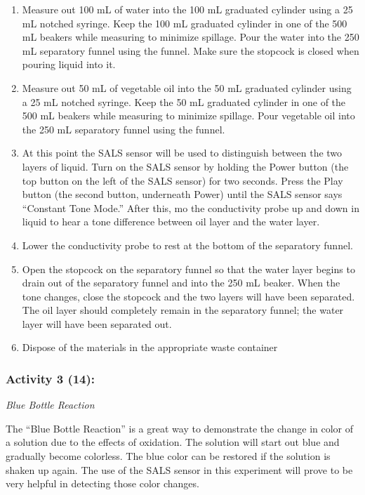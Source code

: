 \documentclass[11.5pt]{sig-alternate} %
\begin{document}
\begin{large}
\begin{enumerate}
    \item Measure out 100 mL of water into the 100 mL graduated cylinder using a 25 mL notched syringe. Keep the 100 mL graduated cylinder in one of the 500 mL beakers while measuring to minimize spillage. Pour the water into the 250 mL separatory funnel using the funnel. Make sure the stopcock is closed when pouring liquid into it.
    \item Measure out 50 mL of vegetable oil into the 50 mL graduated cylinder using a 25 mL notched syringe. Keep the 50 mL graduated cylinder in one of the 500 mL beakers while measuring to minimize spillage. Pour vegetable oil into the 250 mL separatory funnel using the funnel.
    \item At this point the SALS sensor will be used to distinguish between the two layers of liquid. Turn on the SALS sensor by holding the Power button (the top button on the left of the SALS sensor) for two seconds. Press the Play button (the second button, underneath Power) until the SALS sensor says “Constant Tone Mode.” After this, mo the conductivity probe up and down in  liquid to hear a tone difference between  oil layer and the water layer.
    \item Lower the conductivity probe to rest at the bottom of the separatory funnel.
    \item Open the stopcock on the separatory funnel so that the water layer begins to drain out of the separatory funnel and into the 250 mL beaker. When the tone changes, close the stopcock and the two layers will have been separated. The oil layer should completely remain in the separatory funnel; the water layer will have been separated out.
    \item Dispose of the materials in the appropriate waste container
\end{enumerate}

\subsubsection*{Activity 3 (14):}

\textit{Blue Bottle Reaction}

The “Blue Bottle Reaction” is a great way to demonstrate the change in color of a solution due to the effects of oxidation. The solution will start out blue and gradually become colorless. The blue color can be restored if the solution is shaken up again. The use of the SALS sensor in this experiment will prove to be very helpful in detecting those color changes.


\end{large}
\end{document}
